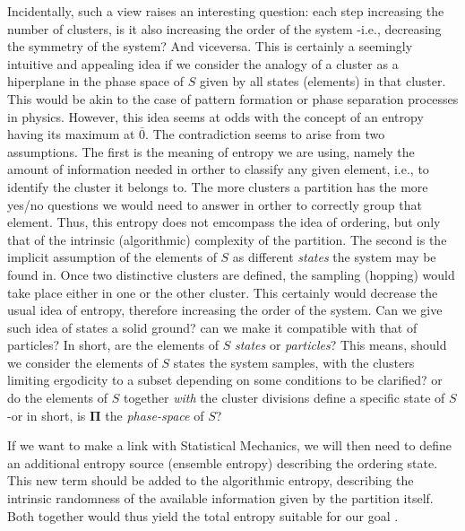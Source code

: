 \documentclass[twocolumn,aps,sort,nofootinbib]{revtex4}
\begin{document}
Incidentally, such a view raises an interesting question:
each step increasing the number of clusters, is it also increasing the order of
the system -i.e., decreasing the symmetry of the system? And viceversa.
This is certainly a seemingly intuitive and appealing idea
if we consider the analogy of a cluster as a hiperplane in
the phase space of $S$ given by all states (elements) in that cluster. 
This would be akin to the case of pattern formation or
phase separation processes in physics.
However, this idea seems at odds with the concept of an entropy having its maximum
at ${\bar 0}$. 
The contradiction seems to arise from two assumptions.
The first is the meaning of entropy we are using, namely the
amount of information needed in orther to classify any given element, 
i.e., to identify the cluster it belongs to. The more clusters
a partition has the more yes/no questions we would need to answer
in orther to correctly group that element. Thus, this entropy does
not emcompass the idea of ordering, but only that of the 
intrinsic (algorithmic) complexity of
the partition.
The second is the implicit assumption of the elements of $S$ as different {\sl states} the
system may be found in. Once two distinctive clusters are defined,
the sampling (hopping) would take place either in one or the other cluster. This
certainly would decrease the usual idea of entropy, therefore
increasing the order of the system. Can we give such idea of states
a solid ground? can we make it compatible with that of particles?
In short, are the elements of $S$ {\sl states} or {\sl particles}?
This means, should we consider the elements of $S$ states the system
samples, with the clusters limiting ergodicity to a subset depending
on some conditions to be clarified? or do the elements of $S$ together
{\sl with} the cluster divisions define a specific state of $S$ -or in short, 
is $\boldsymbol{\Pi}$ the {\sl phase-space} of $S$?

If we want to make a link with Statistical Mechanics, we will then need
to define an additional entropy source (ensemble entropy)
describing the ordering state. 
This new term should be added to the algorithmic entropy, 
describing the intrinsic randomness of the available information 
given by the partition itself. Both together would thus yield
the total entropy suitable for our goal \cite{Zurek89-1,Zurek89-2}.
\end{document}
